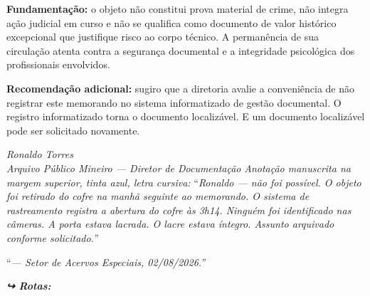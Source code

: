 \noindent \textbf{Fundamentação:} o objeto não constitui prova material de crime, não integra ação judicial em curso e não se qualifica como documento de valor histórico excepcional que justifique risco ao corpo técnico. A permanência de sua circulação atenta contra a segurança documental e a integridade psicológica dos profissionais envolvidos.

\noindent \textbf{Recomendação adicional:} sugiro que a diretoria avalie a conveniência de não registrar este memorando no sistema informatizado de gestão documental. O registro informatizado torna o documento localizável. E um documento localizável pode ser solicitado novamente.

\noindent \textit{Ronaldo Torres}\\
\noindent \textit{Arquivo Público Mineiro --- Diretor de Documentação}
\noindent \textit{Anotação manuscrita na margem superior, tinta azul, letra cursiva:}
\noindent \textquotedblleft{}\textit{Ronaldo --- não foi possível. O objeto foi retirado do cofre na manhã seguinte ao memorando. O sistema de rastreamento registra a abertura do cofre às 3h14. Ninguém foi identificado nas câmeras. A porta estava lacrada. O lacre estava íntegro. Assunto arquivado conforme solicitado.\textquotedblright{}}

\noindent \textquotedblleft{}\textit{--- Setor de Acervos Especiais, 02/08/2026.\textquotedblright{}}

\vspace{0.5em}
\noindent\textit{\textbf{↪ Rotas:}  \rotasep {} \rotasep {}}